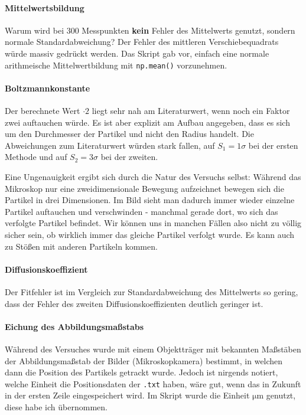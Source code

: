 \paragraph{Mittelwertsbildung}
Warum wird bei 300 Messpunkten \textbf{kein} Fehler des Mittelwerts genutzt, sondern normale Standardabweichung? Der Fehler des mittleren Verschiebequadrats würde massiv gedrückt werden. Das Skript gab vor, einfach eine normale arithmeische Mittelwertbildung mit \verb|np.mean()| vorzunehmen.

\paragraph{Boltzmannkonstante}
Der berechnete Wert \(\cdot2\) liegt sehr nah am Literaturwert, wenn noch ein Faktor zwei auftauchen würde. Es ist aber explizit am Aufbau angegeben, dass es sich um den Durchmesser der Partikel und nicht den Radius handelt. Die Abweichungen zum Literaturwert würden stark fallen, auf \(S_1=\num{1}\sigma\) bei der ersten Methode und auf \(S_2=\num{3}\sigma\) bei der zweiten. 

Eine Ungenauigkeit ergibt sich durch die Natur des Versuchs selbst: Während das Mikroskop nur eine zweidimensionale Bewegung aufzeichnet bewegen sich die Partikel in drei Dimensionen. Im Bild sieht man dadurch immer wieder einzelne Partikel auftauchen und verschwinden - manchmal gerade dort, wo sich das verfolgte Partikel befindet. Wir können uns in manchen Fällen also nicht zu völlig sicher sein, ob wirklich immer das gleiche Partikel verfolgt wurde. Es kann auch zu Stößen mit anderen Partikeln kommen.

\paragraph{Diffusionskoeffizient}
Der Fitfehler ist im Vergleich zur Standardabweichung des Mittelwerts so gering, dass der Fehler des zweiten Diffusionskoeffizienten deutlich geringer ist.

\paragraph{Eichung des Abbildungsmaßstabs}
Während des Versuches wurde mit einem Objektträger mit bekannten Maßstäben der Abbildungsmaßstab der Bilder (Mikroskopkamera) bestimmt, in welchen dann die Position des Partikels getrackt wurde. Jedoch ist nirgends notiert, welche Einheit die Positionsdaten der \verb|.txt| haben, wäre gut, wenn das in Zukunft in der ersten Zeile eingespeichert wird. Im Skript\autocite{Skript_2.1} wurde die Einheit \(\unit{\micro\m}\) genutzt, diese habe ich übernommen.

